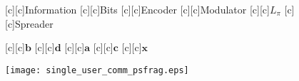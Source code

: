 \documentclass{article}
\begin{document}
\begin{figure}[htb]
  \begin{center}


        [c][c]{Information}
        [c][c]{Bits}
        [c][c]{Encoder}
        [c][c]{Modulator}
        [c][c]{$L_\pi$}
        [c][c]{Spreader}

        [c][c]{$\mathrm{\mathbf{b}}$}
        [c][c]{\hspace{-3mm}$\mathrm{\mathbf{d}}$}
        [c][c]{$\mathrm{\mathbf{a}}$}
        [c][c]{$\mathrm{\mathbf{c}}$}
        [c][c]{$\mathrm{\mathbf{x}}$}


    \texttt{[image: single\_user\_comm\_psfrag.eps]}
    \end{center}
\end{figure}
\end{document}
